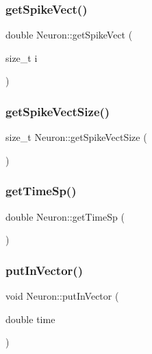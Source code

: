 \subsubsection{get\+Spike\+Vect()}
{\footnotesize\ttfamily double Neuron\+::get\+Spike\+Vect (\begin{DoxyParamCaption}\item[{size\+\_\+t}]{i }\end{DoxyParamCaption})\hspace{0.3cm}{\ttfamily [inline]}}

\mbox{\label{class_neuron_ad9141cb0791f75a92f0b9d1543346193}} 
\subsubsection{get\+Spike\+Vect\+Size()}
{\footnotesize\ttfamily size\+\_\+t Neuron\+::get\+Spike\+Vect\+Size (\begin{DoxyParamCaption}{ }\end{DoxyParamCaption})\hspace{0.3cm}{\ttfamily [inline]}}

\mbox{\label{class_neuron_af4f57ac98e4be891d6e1b04d131a28dd}} 
\subsubsection{get\+Time\+Sp()}
{\footnotesize\ttfamily double Neuron\+::get\+Time\+Sp (\begin{DoxyParamCaption}{ }\end{DoxyParamCaption})\hspace{0.3cm}{\ttfamily [inline]}}

\mbox{\label{class_neuron_a00617ab481fd653493257c84b4e07dda}} 
\subsubsection{put\+In\+Vector()}
{\footnotesize\ttfamily void Neuron\+::put\+In\+Vector (\begin{DoxyParamCaption}\item[{double}]{time }\end{DoxyParamCaption})}

